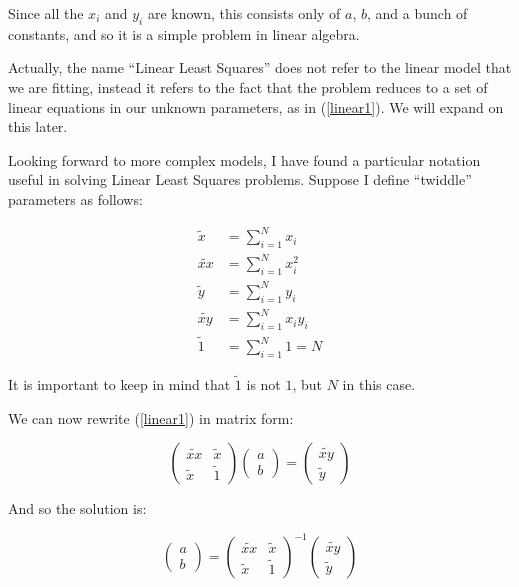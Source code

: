 \documentclass[letterpaper,12pt]{article}
\begin{document}
Since all the $x_i$ and $y_i$ are known, this consists only of $a$, $b$, and a bunch of constants, and so it is a simple problem in linear algebra.

Actually, the name ``Linear Least Squares'' does not refer to the linear model that we are fitting, instead it refers to the fact that the problem reduces to a set of linear equations in our unknown parameters, as in (\ref{linear1}). We will expand on this later.

Looking forward to more complex models, I have found a particular notation useful in solving Linear Least Squares problems. Suppose I define ``twiddle'' parameters as follows:

\begin{equation}
\begin{aligned}
\label{twiddle1}
\widetilde{x}&=\sum_{i=1}^N x_i\\
\widetilde{xx}&=\sum_{i=1}^N x_i^2\\
\widetilde{y}&=\sum_{i=1}^N y_i\\
\widetilde{xy}&=\sum_{i=1}^N x_i y_i\\
\widetilde{1}&=\sum_{i=1}^N 1=N
\end{aligned}
\end{equation}

It is important to keep in mind that $\widetilde{1}$ is not $1$, but $N$ in this case. 

We can now rewrite (\ref{linear1}) in matrix form:

\begin{equation}
\begin{pmatrix}
\widetilde{xx} & \widetilde{x} \\
\widetilde{x} & \widetilde{1}
\end{pmatrix}
\begin{pmatrix}
a \\
b
\end{pmatrix} =
\begin{pmatrix}
\widetilde{xy}  \\
\widetilde{y}
\end{pmatrix}
\end{equation}

And so the solution is:

\begin{equation}
\begin{pmatrix}
a \\
b
\end{pmatrix} =
\begin{pmatrix}
\widetilde{xx} & \widetilde{x} \\
\widetilde{x} & \widetilde{1}
\end{pmatrix} ^{-1}
\begin{pmatrix}
\widetilde{xy}  \\
\widetilde{y}
\end{pmatrix}
\end{equation}
\end{document}
